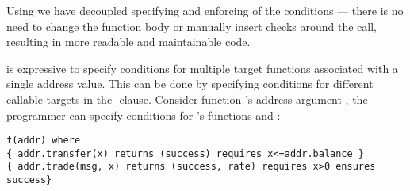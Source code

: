 Using \lang we  have decoupled specifying and enforcing of the conditions
--- there is no need to change the function body or manually insert checks
around the call, resulting in more readable and maintainable code. 

\lang is expressive to specify conditions for multiple target functions associated with a single address value.
This can be done by  specifying conditions for different callable targets
in the -clause. 
Consider function 's address argument , the programmer can specify
conditions for 's functions  and :
\begin{lstlisting}[language=Consol]
f(addr) where
{ addr.transfer(x) returns (success) requires x<=addr.balance }
{ addr.trade(msg, x) returns (success, rate) requires x>0 ensures success}
\end{lstlisting}

